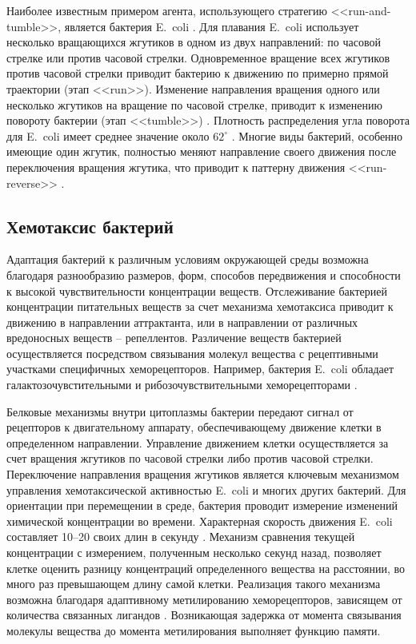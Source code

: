 Наиболее известным примером агента, использующего стратегию <<run-and-tumble>>, является бактерия E.~coli \cite{berg_chemotaxis_1972}. Для плавания E.~coli использует несколько вращающихся жгутиков в одном из двух направлений: по часовой стрелке или против часовой стрелки. Одновременное вращение всех жгутиков против часовой стрелки приводит бактерию к движению по примерно прямой траектории (этап <<run>>). Изменение направления вращения одного или несколько жгутиков на вращение по часовой стрелке, приводит к изменению повороту бактерии (этап <<tumble>>) \cite{turner_realtime_2000}. Плотность распределения угла поворота для E.~coli имеет среднее значение около $62^\circ$ \cite{berg_chemotaxis_1972}. Многие виды бактерий, особенно имеющие один жгутик, полностью меняют направление своего движения после переключения вращения жгутика, что приводит к паттерну движения <<run-reverse>> \cite{theves_bacterial_2013}.

\subsection{Хемотаксис бактерий}\label{subsec:ch1/sec1/sub3}

Адаптация бактерий к различным условиям окружающей среды возможна благодаря разнообразию размеров, форм, способов передвижения и способности к высокой чувствительности концентрации веществ. Отслеживание бактерией концентрации питательных веществ за счет механизма хемотаксиса приводит к движению в направлении аттрактанта, или в направлении от различных вредоносных веществ -- репеллентов. Различение веществ бактерией осуществляется посредством связывания молекул вещества с рецептивными участками специфичных хеморецепторов. Например, бактерия E.~coli обладает галактозочувстительными и рибозочувствительными хеморецепторами \cite{vorotnikov_chemotaxis_2011}.

Белковые механизмы внутри цитоплазмы бактерии передают сигнал от рецепторов к двигательному аппарату, обеспечивающему движение клетки в определенном направлении. Управление движением клетки осуществляется за счет вращения жгутиков по часовой стрелки либо против часовой стрелки. Переключение направления вращения жгутиков является ключевым механизмом управления хемотаксической активностью E.~coli и многих других бактерий. Для ориентации при перемещении в среде, бактерия проводит измерение изменений химической концентрации во времени. Характерная скорость движения E.~coli составляет 10--20 своих длин в секунду \cite{milo_cell_2015}. Механизм сравнения текущей концентрации с измерением, полученным несколько секунд назад, позволяет клетке оценить разницу концентраций определенного вещества на расстоянии, во много раз превышающем длину самой клетки. Реализация такого механизма возможна благодаря адаптивному метилированию хеморецепторов, зависящем от количества связанных лигандов \cite{strayer_biohimiya_1984}. Возникающая задержка от момента связывания молекулы вещества до момента метилирования выполняет функцию памяти.

